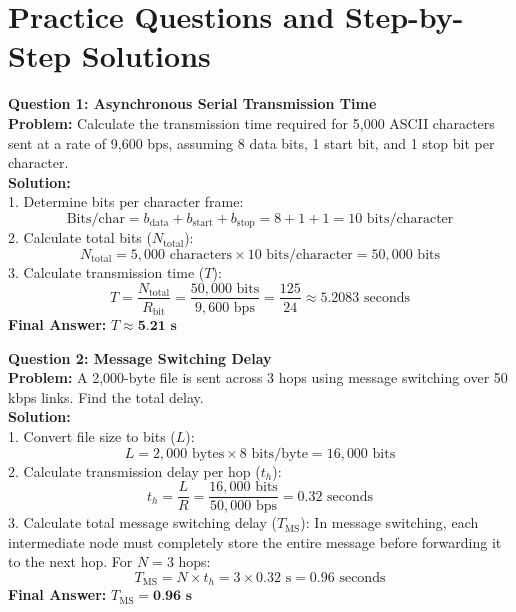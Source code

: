 \documentclass[12pt,a4paper]{report}
\begin{document}
\section{Practice Questions and Step-by-Step Solutions}

\textbf{Question 1: Asynchronous Serial Transmission Time} \\
\textbf{Problem:} Calculate the transmission time required for 5,000 ASCII characters sent at a rate of 9,600 bps, assuming 8 data bits, 1 start bit, and 1 stop bit per character. \\
\textbf{Solution:} \\
1. Determine bits per character frame:
\[ \text{Bits/char} = b_{\text{data}} + b_{\text{start}} + b_{\text{stop}} = 8 + 1 + 1 = 10 \text{ bits/character} \]
2. Calculate total bits ($N_{\text{total}}$):
\[ N_{\text{total}} = 5,000 \text{ characters} \times 10 \text{ bits/character} = 50,000 \text{ bits} \]
3. Calculate transmission time ($T$):
\[ T = \frac{N_{\text{total}}}{R_{\text{bit}}} = \frac{50,000 \text{ bits}}{9,600 \text{ bps}} = \frac{125}{24} \approx 5.2083 \text{ seconds} \]
\textbf{Final Answer:} $T \approx \textbf{5.21 s}$
\vspace{0.5cm}

\textbf{Question 2: Message Switching Delay} \\
\textbf{Problem:} A 2,000-byte file is sent across 3 hops using message switching over 50 kbps links. Find the total delay. \\
\textbf{Solution:} \\
1. Convert file size to bits ($L$):
\[ L = 2,000 \text{ bytes} \times 8 \text{ bits/byte} = 16,000 \text{ bits} \]
2. Calculate transmission delay per hop ($t_h$):
\[ t_h = \frac{L}{R} = \frac{16,000 \text{ bits}}{50,000 \text{ bps}} = 0.32 \text{ seconds} \]
3. Calculate total message switching delay ($T_{\text{MS}}$): In message switching, each intermediate node must completely store the entire message before forwarding it to the next hop. For $N = 3$ hops:
\[ T_{\text{MS}} = N \times t_h = 3 \times 0.32 \text{ s} = 0.96 \text{ seconds} \]
\textbf{Final Answer:} $T_{\text{MS}} = \textbf{0.96 s}$
\vspace{0.5cm}
\end{document}
